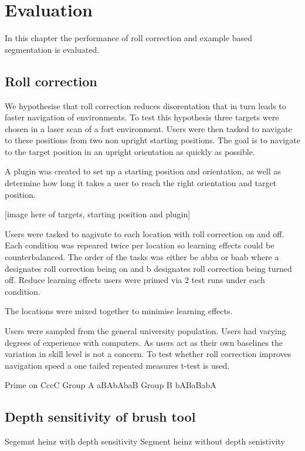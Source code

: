 \chapter{Evaluation} \label{ch:eval}

In this chapter the performance of roll correction and example based segmentation is evaluated.

\section{Roll correction}

We hypothesise that roll correction reduces disorentation that in turn leads to faster navigation of environments. To test this hypothesis three targets were chosen in a laser scan of a fort environment. Users were then tasked to navigate to these positions from two non upright starting positions. The goal is to navigate to the target position in an upright orientation as quickly as possible.

A plugin was created to set up a starting position and orientation, as well as determine how long it takes a user to reach the right orientation and target position.

[image here of targets, starting position and plugin]

Users were tasked to nagivate to each location with roll correction on and off. Each condition was repeared twice per location so learning effects could be counterbalanced. The order of the tasks was either be abba or baab where a designates roll correction being on and b designates roll correction being turned off. Reduce learning effects users were primed via 2 test runs under each condition.

The locations were mixed together to minimise learning effects.

Users were sampled from the general university population. Users had varying degrees of experience with computers. As users act as their own baselines the variation in skill level is not a concern. To test whether roll correction improves navigation speed a one tailed repeated measures t-test is used.

Prime on CccC
Group A aBAbAbaB
Group B bABaBabA

\section{Depth sensitivity of brush tool}

Segemnt heinz with depth sensitivity
Segment heinz without depth senistivity

